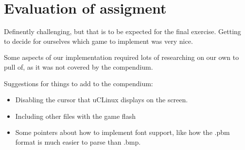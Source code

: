 \chapter{Evaluation of assigment}

Definently challenging, but that is to be expected for the final exercise.
Getting to decide for ourselves which game to implement was very nice.

Some aspects of our implementation required lots of researching on our own to pull of, as it was not covered by the compendium.

\vspace{1em}

Suggestions for things to add to the compendium:
\begin{itemize}
    \item   Disabling the cursor that uCLinux displays on the screen.
    \item   Including other files with the game flash
    \item   Some pointers about how to implement font support, like how the .pbm format is much easier to parse than .bmp.
\end{itemize}
